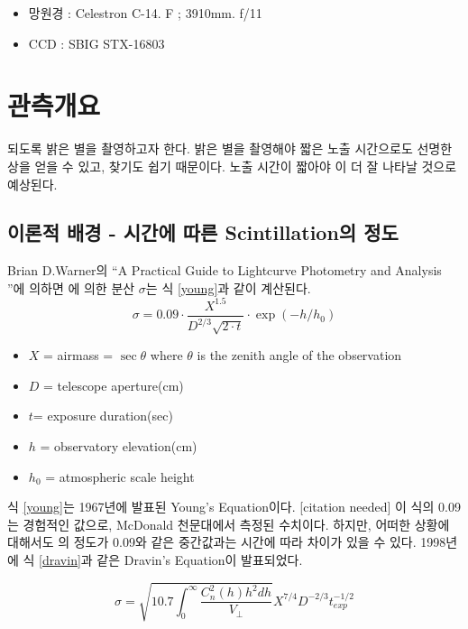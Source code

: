 \documentclass[11pt]{article}
\begin{document}
\begin{itemize}
	\item 망원경 : Celestron C-14. F ; 3910mm. f/11 \cite{telescope}
	\item CCD : SBIG STX-16803 \cite{ccd}
\end{itemize}

\section{관측개요}
되도록 밝은 별을 촬영하고자 한다. 밝은 별을 촬영해야 짧은 노출 시간으로도 선명한 상을 얻을 수 있고, 찾기도 쉽기 때문이다. 노출 시간이 짧아야 \scin 이 더 잘 나타날 것으로 예상된다. 

\subsection{이론적 배경 - 시간에 따른 Scintillation의 정도} \label{exp_1}

Brian D.Warner의 \textquotedblleft A Practical Guide to Lightcurve Photometry and Analysis \textquotedblright 에 의하면 \scin 에 의한 분산 $\sigma$는 식 \ref{young}과 같이 계산된다.
\begin{equation} \label{young}
\sigma = 0.09 \cdot \frac{X^{1.5}}{D^{2/3}\sqrt{2\cdot t}} \cdot \exp{(-h/h_0)}
\end{equation}
\begin{itemize}
	\item $X$ = airmass = $\sec{\theta}$ where $\theta$ is the zenith angle of the observation
	\item $D$ = telescope aperture(cm)
	\item $t$= exposure duration(sec)
	\item $h$ = observatory elevation(cm)
	\item $h_0$ = atmospheric scale height
\end{itemize}

식 \ref{young}는 1967년에 발표된 Young's Equation이다. [citation needed] 이 식의 0.09는 경험적인 값으로, McDonald 천문대에서 측정된 수치이다. 하지만, 어떠한 상황에 대해서도 \scin 의 정도가 0.09와 같은 중간값과는 시간에 따라 차이가 있을 수 있다.\cite{Osborn} 1998년에 식 \ref{dravin}과 같은 Dravin's Equation이 발표되었다.\cite{AISS.1}

\begin{equation} \label{dravin}
\sigma = \sqrt{ 10.7\int_{0}^{\infty}{ \frac{C_n^2(h)h^2dh}{V_\perp} } } X^{7/4}D^{-2/3}t_{exp}^{-1/2}
\end{equation}
\end{document}
